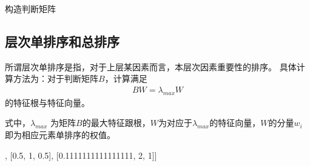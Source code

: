 \documentclass[letterpaper,10pt,english]{sphinxmanual}
\begin{document}

构造判断矩阵



\subsection{层次单排序和总排序}
\label{\detokenize{docs/evaluation_model:id20}}
所谓层次单排序是指，对于上层某因素而言，本层次因素重要性的排序。
具体计算方法为：对于判断矩阵\(B\)，计算满足
\begin{equation*}
\begin{split}
BW=\lambda_{max} W
\end{split}
\end{equation*}
的特征根与特征向量。

式中，\(\lambda_{max}\) 为矩阵\(B\)的最大特征跟根，\(W\)为对应于\(\lambda_{max}\)的特征向量，\(W\)的分量\(w_i\)即为相应元素单排序的权值。

\begin{sphinxVerbatim}[commandchars=\\\{\}]
  \PYG{p}{[}\PYG{p}{[}\PYG{p}{]}\PYG{p}{[}\PYG{p}{]}\PYG{p}{[}\PYG{p}{]}\PYG{p}{]}
\end{sphinxVerbatim}

\begin{sphinxVerbatim}[commandchars=\\\{\}]
[[1, 2, 9], [0.5, 1, 0.5], [0.1111111111111111, 2, 1]]
\end{sphinxVerbatim}

\begin{sphinxVerbatim}[commandchars=\\\{\}]
   
        
\end{sphinxVerbatim}

\begin{sphinxVerbatim}
\end{sphinxVerbatim}
\end{document}
